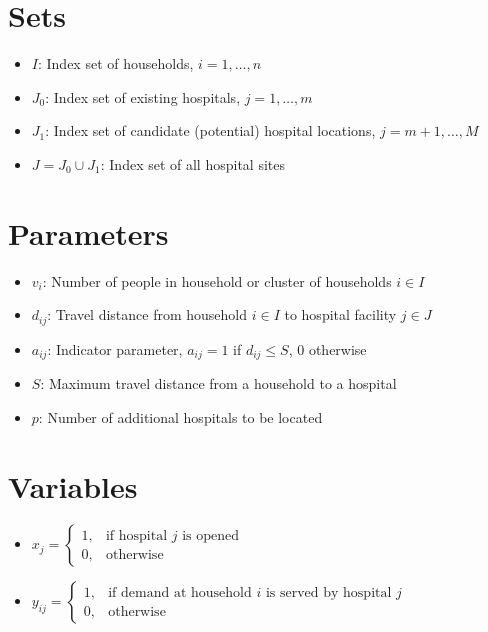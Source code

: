 \documentclass{article}
\begin{document}
\section{Sets}
\begin{itemize}[leftmargin=*,nosep]
    \item $I$: Index set of households, $i = 1, \ldots, n$
    \item $J_0$: Index set of existing hospitals, $j = 1, \ldots, m$
    \item $J_1$: Index set of candidate (potential) hospital locations, $j = m+1, \ldots, M$
    \item $J = J_0 \cup J_1$: Index set of all hospital sites
\end{itemize}

\section{Parameters}
\begin{itemize}[leftmargin=*,nosep]
    \item $v_i$: Number of people in household or cluster of households $i \in I$
    \item $d_{ij}$: Travel distance from household $i \in I$ to hospital facility $j \in J$
    \item $a_{ij}$: Indicator parameter, $a_{ij} = 1$ if $d_{ij} \leq S$, $0$ otherwise
    \item $S$: Maximum travel distance from a household to a hospital
    \item $p$: Number of additional hospitals to be located
\end{itemize}

\section{Variables}
\begin{itemize}[leftmargin=*,nosep]
    \item $x_j = \begin{cases} 
        1, & \text{if hospital } j \text{ is opened} \\ 
        0, & \text{otherwise} 
    \end{cases}$
    \item $y_{ij} = \begin{cases} 
        1, & \text{if demand at household } i \text{ is served by hospital } j \\ 
        0, & \text{otherwise} 
    \end{cases}$
\end{itemize}
\end{document}
